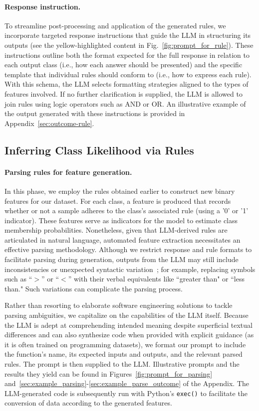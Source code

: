 \vspace*{-0.12in}
\paragraph{Response instruction.} To streamline post-processing and application of the generated rules, we incorporate targeted response instructions that guide the LLM in structuring its outputs (see the yellow-highlighted content in Fig.~\ref{fig:prompt_for_rule}). These instructions outline both the format expected for the full response in relation to each output class (i.e., how each answer should be presented) and the specific template that individual rules should conform to (i.e., how to express each rule). With this schema, the LLM selects formatting strategies aligned to the types of features involved. If no further clarification is supplied, the LLM is allowed to join rules using logic operators such as AND or OR. An illustrative example of the output generated with these instructions is provided in Appendix~\ref{sec:outcome-rule}.

\subsection{Inferring Class Likelihood via Rules}
\label{Sec:training}

\paragraph{Parsing rules for feature generation.} In this phase, we employ the rules obtained earlier to construct new binary features for our dataset. For each class, a feature is produced that records whether or not a sample adheres to the class’s associated rule (using a '0' or '1' indicator). These features serve as indicators for the model to estimate class membership probabilities. Nonetheless, given that LLM-derived rules are articulated in natural language, automated feature extraction necessitates an effective parsing methodology. Although we restrict response and rule formats to facilitate parsing during generation, outputs from the LLM may still include inconsistencies or unexpected syntactic variation~\cite{kovavc2023large}; for example, replacing symbols such as ``$>$” or ``$<$” with their verbal equivalents like ``greater than" or ``less than." Such variations can complicate the parsing process.

Rather than resorting to elaborate software engineering solutions to tackle parsing ambiguities, we capitalize on the capabilities of the LLM itself. Because the LLM is adept at comprehending intended meaning despite superficial textual differences and can also synthesize code when provided with explicit guidance (as it is often trained on programming datasets), we format our prompt to include the function’s name, its expected inputs and outputs, and the relevant parsed rules. The prompt is then supplied to the LLM. Illustrative prompts and the results they yield can be found in Figures~\ref{fig:prompt_for_parsing} and~\ref{sec:example_parsing}-\ref{sec:example_parse_outcome} of the Appendix. The LLM-generated code is subsequently run with Python’s \texttt{exec()} to facilitate the conversion of data according to the generated features.

